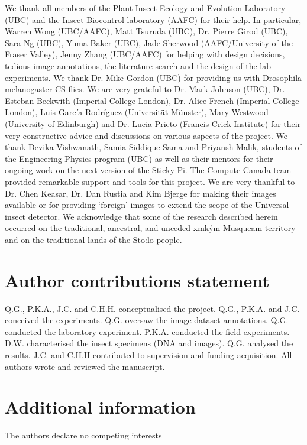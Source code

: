 \documentclass[12pt]{article}
\newcommand{\musqueam}{x\super{w}m\textschwa{}\texttheta{}k\super{w}\textschwa{}\'{y}\textschwa{}m}
\begin{document}
\begin{linenumbers}
{			We thank all members of the Plant-Insect Ecology and Evolution Laboratory (UBC) and the Insect Biocontrol laboratory (AAFC) for their help. In particular, Warren Wong (UBC/AAFC), Matt Tsuruda (UBC), Dr. Pierre Girod (UBC), Sara Ng (UBC), Yuma Baker (UBC), Jade Sherwood (AAFC/University of the Fraser Valley), Jenny Zhang (UBC/AAFC) for helping with design decisions, tedious image annotations, the literature search and the design of the lab experiments. We thank Dr. Mike Gordon (UBC) for providing us with Drosophila melanogaster CS flies. We are very grateful to Dr. Mark Johnson (UBC), Dr. Esteban Beckwith (Imperial College London), Dr. Alice French (Imperial College London), Luis García Rodríguez (Universität Münster), Mary Westwood (University of Edinburgh) and Dr. Lucia Prieto (Francis Crick Institute) for their very constructive advice and discussions on various aspects of the project. We thank Devika Vishwanath, Samia Siddique Sama and Priyansh Malik, students of the Engineering Physics program (UBC) as well as their mentors for their ongoing work on the next version of the Sticky Pi. The Compute Canada team provided remarkable support and tools for this project. 
			We are very thankful to Dr. Chen Keasar, 
			Dr. Dan Rustia \cite{rustia_application_2020}and 
			Kim Bjerge\cite{bjerge_automated_2021}
			for making their images available 
			or for providing `foreign' images to extend the scope of the Universal insect detector.
			We acknowledge that some of the research described herein occurred on the traditional, ancestral, and unceded \musqueam{} Musqueam territory and on the traditional lands of the Sto:lo people.}
		
		\section*{Author contributions statement}
		Q.G., P.K.A., J.C.  and  C.H.H. conceptualised the project.
		Q.G., P.K.A. and J.C. conceived the experiments.
		Q.G. oversaw the image dataset annotations.
		Q.G. conducted the laboratory experiment. 
		P.K.A. conducted the field experiments.
		D.W. characterised the insect specimens (DNA and images).
		Q.G. analysed the results.
		J.C. and C.H.H contributed to supervision and funding acquisition.
		All authors wrote and reviewed the manuscript. 
		
		\section*{Additional information}
		The authors declare no competing interests
		
		
\end{linenumbers}
\end{document}
